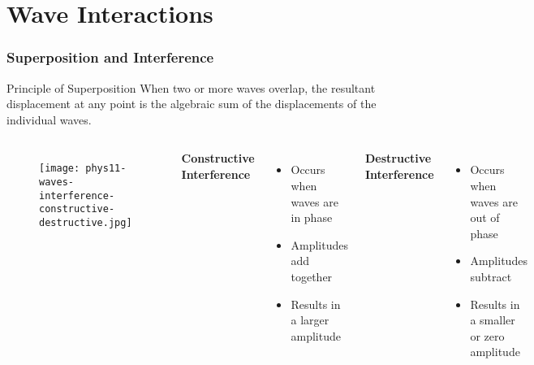 \documentclass{beamer}
\begin{document}
\section{Wave Interactions}

\begin{frame}
\frametitle{Superposition and Interference}
\begin{block}{Principle of Superposition}
When two or more waves overlap, the resultant displacement at any point is the algebraic sum of the displacements of the individual waves.
\end{block}

\begin{columns}

\begin{figure}
    \centering
    \texttt{[image: phys11-waves-interference-constructive-destructive.jpg]}
\end{figure}

\textbf{Constructive Interference}
\begin{itemize}
\item Occurs when waves are in phase
\item Amplitudes add together
\item Results in a larger amplitude
\end{itemize}
\textbf{Destructive Interference}
\begin{itemize}
\item Occurs when waves are out of phase
\item Amplitudes subtract
\item Results in a smaller or zero amplitude
\end{itemize}
\end{columns}
\end{frame}
\end{document}
